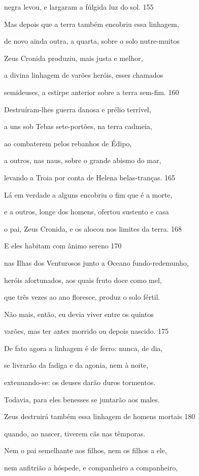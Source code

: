 negra levou, e largaram a fúlgida luz do sol. \num{155}

Mas depois que a terra também encobriu essa linhagem,

de novo ainda outra, a quarta, sobre o solo nutre-muitos

Zeus Cronida produziu, mais justa e melhor,

a divina linhagem de varões heróis, esses chamados

semideuses, a estirpe anterior sobre a terra sem-fim. \num{160}

Destruíram-lhes guerra danosa e prélio terrível,

a uns sob Tebas sete-portões, na terra cadmeia,

ao combaterem pelos rebanhos de Édipo,

a outros, nas naus, sobre o grande abismo do mar,

levando a Troia por conta de Helena belas-tranças. \num{165}

Lá em verdade a alguns encobriu o fim que é a morte,

e a outros, longe dos homens, ofertou sustento e casa

o pai, Zeus Cronida, e os alocou nos limites da terra. \num{168} 

E eles habitam com ânimo sereno \num{170}

nas Ilhas dos Venturosos junto a Oceano fundo-redemunho,

heróis afortunados, aos quais fruto doce como mel,

que três vezes ao ano floresce, produz o solo fértil.

Não mais, então, eu devia viver entre os quintos

varões, mas ter antes morrido ou depois nascido. \num{175}

De fato agora a linhagem é de ferro: nunca, de dia,

se livrarão da fadiga e da agonia, nem à noite,

extenuando-se: os deuses darão duros tormentos.

Todavia, para eles benesses se juntarão aos males.

Zeus destruirá também essa linhagem de homens mortais \num{180}

quando, ao nascer, tiverem cãs nas têmporas.

Nem o pai semelhante aos filhos, nem os filhos a ele,

nem anfitrião a hóspede, e companheiro a companheiro,

